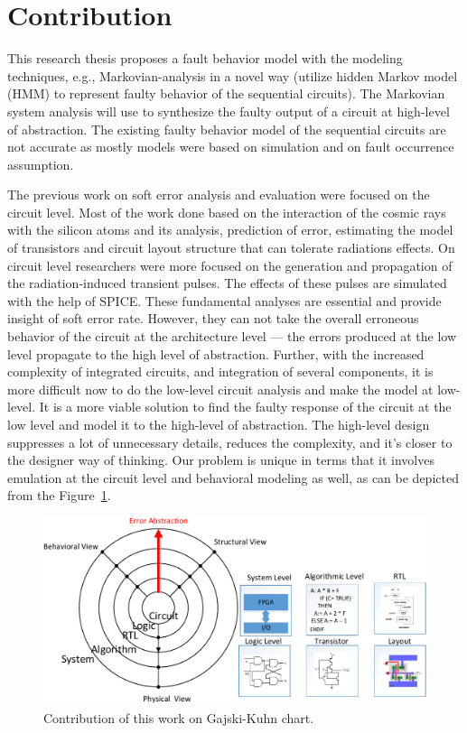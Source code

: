   

\section{Contribution}


This research thesis proposes a fault behavior model with the modeling techniques, e.g., Markovian-analysis in a novel way (utilize hidden Markov model (HMM) to represent faulty behavior of the sequential circuits). The Markovian system analysis will use to synthesize the faulty output of a circuit at high-level of abstraction. The existing faulty behavior model of the sequential circuits are not accurate as mostly models were based on simulation and on fault occurrence assumption. 

The previous work on soft error analysis and evaluation were focused on the circuit level. Most of the work done based on the interaction of the cosmic rays with the silicon atoms and its analysis, prediction of error, estimating the model of transistors and circuit layout structure that can tolerate radiations effects. On circuit level researchers were more focused on the generation and propagation of the radiation-induced transient pulses. The effects of these pulses are simulated with the help of SPICE. These fundamental analyses are essential and provide insight of soft error rate. However, they can not take the overall erroneous behavior of the circuit at the architecture level --- the errors produced at the low level propagate to the high level of abstraction. Further, with the increased complexity of integrated circuits, and integration of several components, it is more difficult now to do the low-level circuit analysis and make the model at low-level. It is a more viable solution to find the faulty response of the circuit at the low level and model it to the high-level of abstraction. The high-level design suppresses a lot of unnecessary details, reduces the complexity, and it's closer to the designer way of thinking. Our problem is unique in terms that it involves emulation at the circuit level and behavioral modeling as well, as can be depicted from the Figure~\ref{fig:ychart}.


\begin{figure}[tb!]

 \centering
  \captionsetup{justification=centering}    
   \includegraphics[scale=0.8]{Figures/ychart-block.pdf}
   \caption{Contribution of this work on Gajski-Kuhn chart.}
\label{fig:ychart}
\end{figure}



